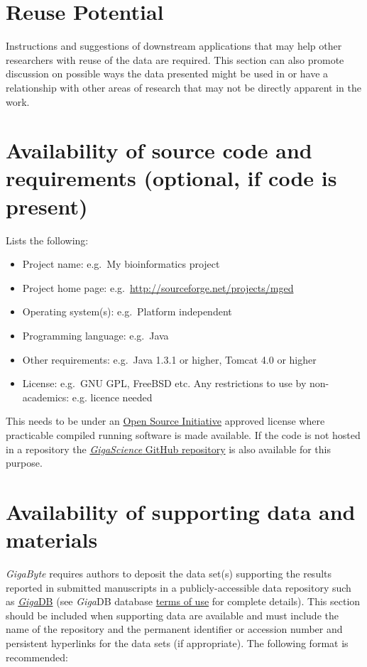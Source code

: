 \documentclass[a4paper,num-refs,gigabyte]{oup-contemporary}
\begin{document}
\section{Reuse Potential}

Instructions and suggestions of downstream applications that may help other researchers with reuse of the data are required. This section can also promote discussion on possible ways the data presented might be used in or have a relationship with other areas of research that may not be directly apparent in the work.

\section{Availability of source code and requirements (optional, if code is present)}

Lists the following:
\begin{itemize}
\item Project name: e.g.~My bioinformatics project
\item Project home page: e.g.~\url{http://sourceforge.net/projects/mged}
\item Operating system(s): e.g.~Platform independent
\item Programming language: e.g.~Java
\item Other requirements: e.g.~Java 1.3.1 or higher, Tomcat 4.0 or higher
\item License: e.g.~GNU GPL, FreeBSD etc.
Any restrictions to use by non-academics: e.g. licence needed
\end{itemize}

This needs to be under an \href{http:/opensource.org/licenses}{Open Source Initiative} approved license where practicable compiled running software is made available. If the code is not hosted in a repository the \href{https://github.com/gigascience}{\textit{GigaScience} GitHub repository} is also available for this purpose.

\section{Availability of supporting data and materials}

\textit{GigaByte} requires authors to deposit the data set(s) supporting the results reported in submitted manuscripts in a publicly-accessible data repository such as \href{http://gigadb.org/}{\textit{Giga}DB} (see \textit{Giga}DB database \href{http://gigadb.org/site/term}{terms of use} for complete details). This section should be included when supporting data are available and must include the name of the repository and the permanent identifier or accession number and persistent hyperlinks for the data sets (if appropriate). The following format is recommended:
\end{document}
